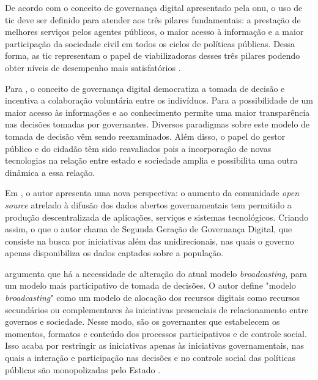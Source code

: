 \par
De acordo com o conceito de governança digital apresentado pela \acrshort{onu}, o uso de \acrshort{tic} deve ser definido para atender aos três pilares fundamentais: 
a prestação de melhores serviços pelos agentes públicos, o maior acesso à informação e a maior participação da sociedade civil em todos os ciclos de políticas públicas. 
Dessa forma, as \acrshort{tic} representam o papel de viabilizadoras desses três pilares podendo obter níveis de desempenho mais satisfatórios \cite{onu2018}. 

\par
Para , o conceito de governança digital democratiza a tomada de decisão e incentiva a colaboração voluntária entre os indivíduos. Para  a possibilidade de um maior acesso às informações e ao conhecimento permite uma maior transparência nas decisões tomadas por governantes. Diversos paradigmas sobre este modelo de tomada de decisão vêm sendo reexaminados. Além disso, o papel do gestor público e do cidadão têm sido reavaliados pois a incorporação 
de novas tecnologias na relação entre estado e sociedade amplia e possibilita uma outra dinâmica a essa relação. 

\par
Em , o autor apresenta uma nova perspectiva: o aumento da comunidade \textit{open source} atrelado à difusão dos dados abertos governamentais tem permitido a produção descentralizada de aplicações, serviços e sistemas tecnológicos. Criando assim, o que o autor chama de Segunda Geração de Governança Digital, 
que consiste na busca por iniciativas além das unidirecionais, nas quais o governo apenas disponibiliza os dados captados sobre a população.

\par

 argumenta que há a necessidade de alteração do atual modelo \textit{broadcasting}, para um modelo mais participativo de tomada de decisões. 
O autor define "modelo \textit{broadcasting}" como um modelo de alocação dos recursos digitais como recursos secundários ou complementares 
às iniciativas presenciais de relacionamento entre governos e sociedade. Nesse modo, são os governantes que estabelecem os momentos, formatos e conteúdo dos processos 
participativos e de controle social. Isso acaba por restringir as iniciativas apenas às iniciativas governamentais, nas quais a interação e participação nas decisões e no
controle social das políticas públicas são monopolizadas pelo Estado \cite{parra2017governancca}.


